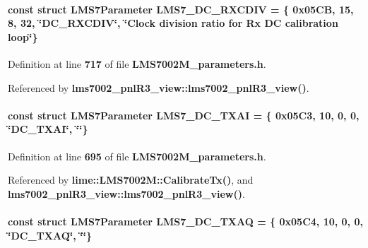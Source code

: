 \paragraph[{L\+M\+S7\+\_\+\+D\+C\+\_\+\+R\+X\+C\+D\+IV}]{\setlength{\rightskip}{0pt plus 5cm}const struct {\bf L\+M\+S7\+Parameter} L\+M\+S7\+\_\+\+D\+C\+\_\+\+R\+X\+C\+D\+IV = \{ 0x05\+C\+B, 15, 8, 32, \char`\"{}\+D\+C\+\_\+\+R\+X\+C\+D\+I\+V\char`\"{}, \char`\"{}\+Clock division ratio for Rx D\+C calibration loop\char`\"{}\}\hspace{0.3cm}{\ttfamily [static]}}\label{LMS7002M__parameters_8h_a87fe582892374eeab4702de59967405a}


Definition at line {\bf 717} of file {\bf L\+M\+S7002\+M\+\_\+parameters.\+h}.



Referenced by {\bf lms7002\+\_\+pnl\+R3\+\_\+view\+::lms7002\+\_\+pnl\+R3\+\_\+view()}.

\paragraph[{L\+M\+S7\+\_\+\+D\+C\+\_\+\+T\+X\+AI}]{\setlength{\rightskip}{0pt plus 5cm}const struct {\bf L\+M\+S7\+Parameter} L\+M\+S7\+\_\+\+D\+C\+\_\+\+T\+X\+AI = \{ 0x05\+C3, 10, 0, 0, \char`\"{}\+D\+C\+\_\+\+T\+X\+A\+I\char`\"{}, \char`\"{}\char`\"{}\}\hspace{0.3cm}{\ttfamily [static]}}\label{LMS7002M__parameters_8h_aa94edd59af6bd7d7670b9409810b82dc}


Definition at line {\bf 695} of file {\bf L\+M\+S7002\+M\+\_\+parameters.\+h}.



Referenced by {\bf lime\+::\+L\+M\+S7002\+M\+::\+Calibrate\+Tx()}, and {\bf lms7002\+\_\+pnl\+R3\+\_\+view\+::lms7002\+\_\+pnl\+R3\+\_\+view()}.

\paragraph[{L\+M\+S7\+\_\+\+D\+C\+\_\+\+T\+X\+AQ}]{\setlength{\rightskip}{0pt plus 5cm}const struct {\bf L\+M\+S7\+Parameter} L\+M\+S7\+\_\+\+D\+C\+\_\+\+T\+X\+AQ = \{ 0x05\+C4, 10, 0, 0, \char`\"{}\+D\+C\+\_\+\+T\+X\+A\+Q\char`\"{}, \char`\"{}\char`\"{}\}\hspace{0.3cm}{\ttfamily [static]}}\label{LMS7002M__parameters_8h_a4d7517a63b3526d0ab6bd2717be4f194}


